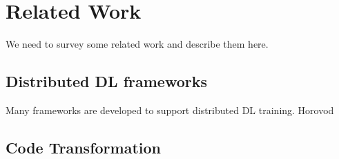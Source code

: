 \section{Related Work}\label{sec:related}
We need to survey some related work and describe them here.

\subsection{Distributed DL frameworks}

Many frameworks are developed to support distributed DL training.
Horovod

\subsection{Code Transformation}
